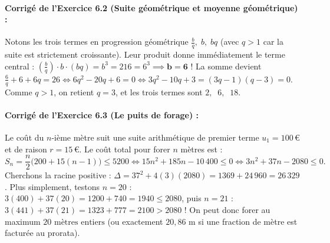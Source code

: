 \paragraph{Corrigé de l'Exercice 6.2 (Suite géométrique et moyenne géométrique) :}
Notons les trois termes en progression géométrique $\frac{b}{q},\; b,\; bq$ (avec $q > 1$ car la suite est strictement croissante).
Leur produit donne immédiatement le terme central : $\left(\frac{b}{q}\right)\cdot b \cdot (bq) = b^3 = 216 = 6^3 \implies \mathbf{b = 6}$ !
La somme devient $\frac{6}{q} + 6 + 6q = 26 \iff 6q^2 - 20q + 6 = 0 \iff 3q^2 - 10q + 3 = (3q - 1)(q - 3) = 0$.
Comme $q > 1$, on retient $q = 3$, et les trois termes sont $\boxed{2,\;\; 6,\;\; 18}$.

\paragraph{Corrigé de l'Exercice 6.3 (Le puits de forage) :}
Le coût du $n$-ième mètre suit une suite arithmétique de premier terme $u_1 = 100$\,€ et de raison $r = 15$\,€. Le coût total pour forer $n$ mètres est :
\[
    S_n = \frac{n}{2}\bigl(200 + 15(n - 1)\bigr) \le 5200 \iff 15n^2 + 185n - 10\,400 \le 0 \iff 3n^2 + 37n - 2080 \le 0.
\]
Cherchons la racine positive : $\Delta = 37^2 + 4(3)(2080) = 1369 + 24\,960 = 26\,329$. Plus simplement, testons $n = 20$ : $3(400) + 37(20) = 1200 + 740 = 1940 \le 2080$, puis $n = 21$ : $3(441) + 37(21) = 1323 + 777 = 2100 > 2080$ !
On peut donc forer au maximum $\boxed{20\text{ mètres entiers}}$ (ou exactement $20,86\text{ m}$ si une fraction de mètre est facturée au prorata).

